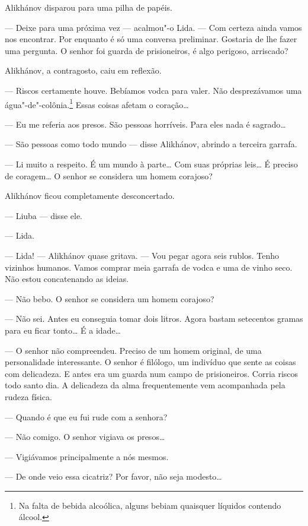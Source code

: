 Alikhánov disparou para uma pilha de papéis.

--- Deixe para uma próxima vez --- acalmou"-o Lida. --- Com certeza ainda
vamos nos encontrar. Por enquanto é só uma conversa preliminar. Gostaria
de lhe fazer uma pergunta. O senhor foi guarda de prisioneiros, é algo
perigoso, arriscado?

Alikhánov, a contragosto, caiu em reflexão.

--- Riscos certamente houve. Bebíamos vodca para valer. Não
desprezávamos uma água"-de"-colônia.\footnote{Na falta de bebida
  alcoólica, alguns bebiam quaisquer líquidos contendo álcool.} Essas
coisas afetam o coração\ldots{}

--- Eu me referia aos presos. São pessoas horríveis. Para eles nada é
sagrado\ldots{}

--- São pessoas como todo mundo --- disse Alikhánov, abrindo a terceira
garrafa.

--- Li muito a respeito. É um mundo à parte\ldots{} Com suas próprias leis\ldots{}
É preciso de coragem\ldots{} O senhor se considera um homem corajoso?

Alikhánov ficou completamente desconcertado.

--- Liuba --- disse ele.

--- Lida. \label{ref7}

--- Lida! --- Alikhánov quase gritava. --- Vou pegar agora seis rublos.
Tenho vizinhos humanos. Vamos comprar meia garrafa de vodca e uma de
vinho seco. Não estou concatenando as ideias.

--- Não bebo. O senhor se considera um homem corajoso?

--- Não sei. Antes eu conseguia tomar dois litros. Agora bastam
setecentos gramas para eu ficar tonto\ldots{} É a idade\ldots{}

--- O senhor não compreendeu. Preciso de um homem original, de uma \label{ref8}
personalidade interessante. O senhor é filólogo, um indivíduo que sente
as coisas com delicadeza. E antes era um guarda num campo de
prisioneiros. Corria riscos todo santo dia. A delicadeza da alma
frequentemente vem acompanhada pela rudeza física.

--- Quando é que eu fui rude com a senhora?

--- Não comigo. O senhor vigiava os presos\ldots{}

--- Vigiávamos principalmente a nós mesmos.

--- De onde veio essa cicatriz? Por favor, não seja modesto\ldots{}

